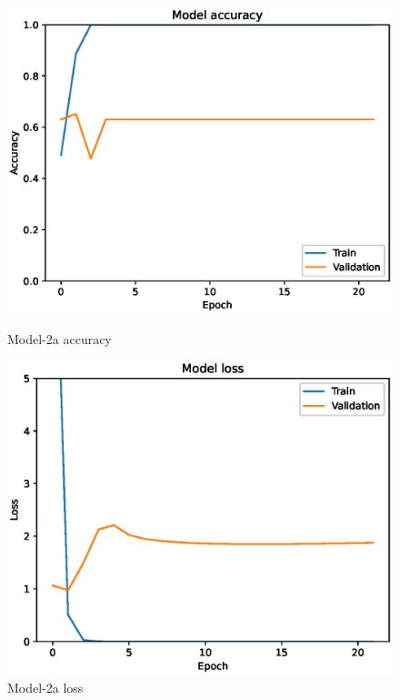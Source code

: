 \begin{figure}
    \centering
    \begin{minipage}{0.45\textwidth}
        \centering
        \includegraphics[width=\textwidth]{./fig/model2/accuracy2a.eps}
        \caption{Model-2a accuracy}
        \label{fig:model2a_acc}
    \end{minipage}
    \begin{minipage}{0.45\textwidth}
        \centering
        \includegraphics[width=\textwidth]{./fig/model2/loss2a.eps}
        \caption{Model-2a loss}
        \label{fig:model2a_loss}
    \end{minipage}
\end{figure}



